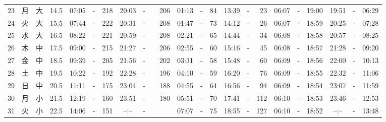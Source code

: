 \documentclass[12pt,a4j]{jsarticle}
\begin{document}
\begin{table}[htbp]
\begin{center}
{\begin{tabular}{|rc|cr|ccrccr|ccrccr|ccc|ccc|}
23 & 月 & 大 & 14.5 &  07:05 &-& 218 &  20:03 &-& 206 &  01:13 &-&  84 &  13:39 &-&  23 & 06:07 & -& 19:00 & 19:51 & -& 06:29 \\
24 & 火 & 大 & 15.5 &  07:44 &-& 222 &  20:31 &-& 208 &  01:47 &-&  73 &  14:12 &-&  26 & 06:07 & -& 18:59 & 20:25 & -& 07:28 \\
25 & 水 & 大 & 16.5 &  08:22 &-& 221 &  20:59 &-& 208 &  02:21 &-&  65 &  14:44 &-&  34 & 06:08 & -& 18:58 & 20:57 & -& 08:25 \\
26 & 木 & 中 & 17.5 &  09:00 &-& 215 &  21:27 &-& 206 &  02:55 &-&  60 &  15:16 &-&  45 & 06:08 & -& 18:57 & 21:28 & -& 09:20 \\
27 & 金 & 中 & 18.5 &  09:39 &-& 205 &  21:56 &-& 202 &  03:31 &-&  58 &  15:48 &-&  60 & 06:09 & -& 18:56 & 22:00 & -& 10:13 \\
28 & 土 & 中 & 19.5 &  10:22 &-& 192 &  22:28 &-& 196 &  04:10 &-&  59 &  16:20 &-&  76 & 06:09 & -& 18:55 & 22:32 & -& 11:06 \\
29 & 日 & 中 & 20.5 &  11:11 &-& 175 &  23:04 &-& 188 &  04:55 &-&  64 &  16:56 &-&  94 & 06:09 & -& 18:54 & 23:07 & -& 11:59 \\
30 & 月 & 小 & 21.5 &  12:19 &-& 160 &  23:51 &-& 180 &  05:51 &-&  70 &  17:41 &-& 112 & 06:10 & -& 18:53 & 23:46 & -& 12:53 \\
31 & 火 & 小 & 22.5 &  14:06 &-& 151 &  --:-- &-&~~~~~ &  07:07 &-&  75 &  18:55 &-& 127 & 06:10 & -& 18:52 & --:-- & -& 13:48 \\
   \hline
   \end{tabular}}
   \end{center}
\end{table}
\newpage
\end{document}
